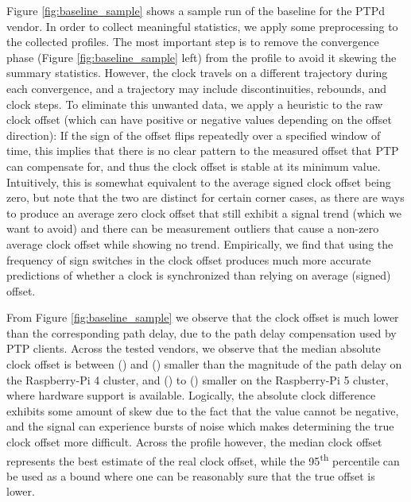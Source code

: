 Figure \ref{fig:baseline_sample} shows a sample run of the baseline for the PTPd vendor. In order to collect meaningful statistics, we apply some preprocessing to the collected profiles. The most important step is to remove the convergence phase (Figure \ref{fig:baseline_sample} left) from the profile to avoid it skewing the summary statistics. However, the clock travels on a different trajectory during each convergence, and a trajectory may include discontinuities, rebounds, and clock steps. To eliminate this unwanted data, we apply a heuristic to the raw clock offset (which can have positive or negative values depending on the offset direction): If the sign of the offset flips repeatedly over a specified window of time, this implies that there is no clear pattern to the measured offset that PTP can compensate for, and thus the clock offset is stable at its minimum value. Intuitively, this is somewhat equivalent to the average signed clock offset being zero, but note that the two are distinct for certain corner cases, as there are ways to produce an average zero clock offset that still exhibit a signal trend (which we want to avoid) and there can be measurement outliers that cause a non-zero average clock offset while showing no trend. Empirically, we find that using the frequency of sign switches in the clock offset produces much more accurate predictions of whether a clock is synchronized than relying on average (signed) offset.

From Figure \ref{fig:baseline_sample} we observe that the clock offset is much lower than the corresponding path delay, due to the path delay compensation used by PTP clients. Across the tested vendors, we observe that the median absolute clock offset is between \fRatio{\cmpMin} (\fVendor{\cmpMinArg}) and \fRatio{\cmpMax} (\fVendor{\cmpMaxArg}) smaller than the magnitude of the path delay on the Raspberry-Pi 4 cluster,%
%
and \fRatio{\cmpMin} (\fVendor{\cmpMinArg}) to \fRatio{\cmpMax} (\fVendor{\cmpMaxArg}) smaller on the Raspberry-Pi 5 cluster, where hardware support is available.
Logically, the absolute clock difference exhibits some amount of skew due to the fact that the value cannot be negative, and the signal can experience bursts of noise which makes determining the true clock offset more difficult. Across the profile however, the median clock offset represents the best estimate of the real clock offset, while the 95\textsuperscript{th} percentile can be used as a bound where one can be reasonably sure that the true offset is lower.

